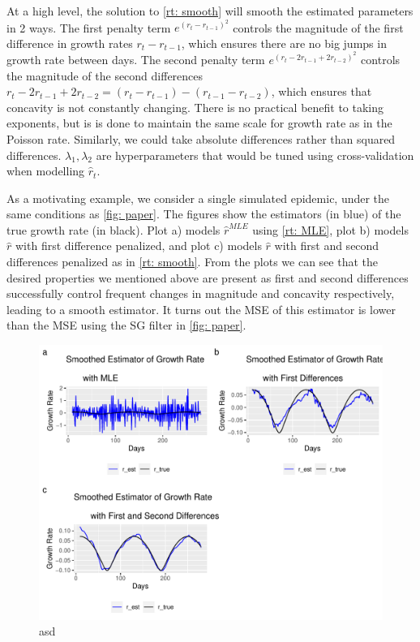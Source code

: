 \documentclass[12pt]{article}
\begin{document}
      At a high level, the solution to \cref{rt: smooth} will smooth the estimated parameters in 2 ways. The first penalty term $e^{(r_t - r_{t - 1})^2}$ controls
      the magnitude of the first difference in growth rates $r_t - r_{t - 1}$, which ensures there are no big jumps in growth rate between days. 
      The second penalty term $e^{(r_t - 2r_{t - 1} + 2r_{t - 2})^2}$ controls
      the magnitude of the second differences $r_t - 2r_{t - 1} + 2r_{t - 2} = (r_t - r_{t - 1}) - (r_{t - 1} - r_{t - 2})$, 
      which ensures that concavity is not constantly changing. There is no practical benefit to taking exponents, but is is done to maintain the same scale 
      for growth rate as in the Poisson rate. Similarly, we could take absolute differences rather than squared differences. $\lambda_1, \lambda_2$ are 
      hyperparameters that would be tuned using cross-validation when modelling $\hat{r}_t$.

      As a motivating example, we consider a single simulated epidemic, under the same conditions as \cref{fig: paper}. The figures show the estimators (in blue)
      of the true growth rate (in black). Plot a) models $\hat{r}^{MLE}$ using \cref{rt: MLE}, plot b) models $\hat{r}$ with first difference penalized, 
      and plot c) models $\hat{r}$ with first and second differences penalized as in \cref{rt: smooth}. From the plots we can see that the desired properties 
      we mentioned above are present as first and second differences successfully control frequent changes in magnitude and concavity respectively, 
      leading to a smooth estimator. It turns out the MSE of this estimator is lower than the MSE using the SG filter in \cref{fig: paper}.

      \begin{figure}[h]
        \includegraphics[width = \linewidth]{estimate_growthrate.pdf}
        \caption{asd}
        \label{fig: smoothrt}
      \end{figure}
\end{document}
